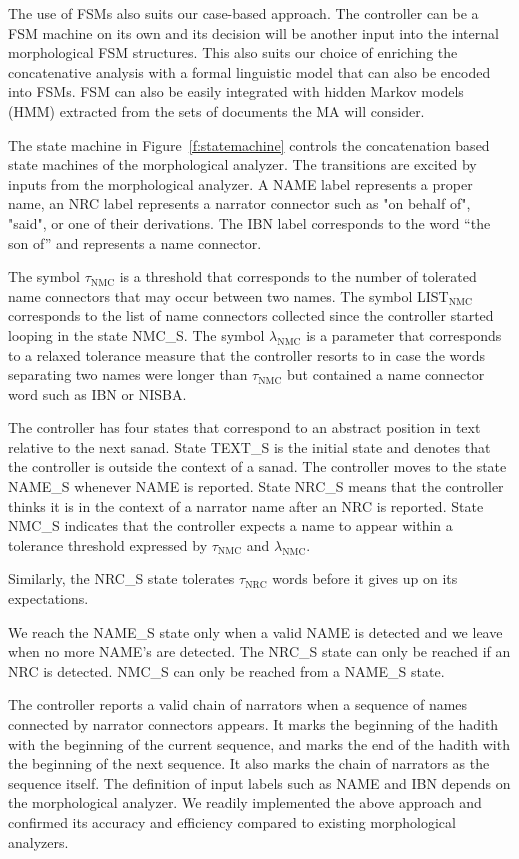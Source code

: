 \documentclass[12pt]{article}
\begin{document}
{The use of FSMs also suits our case-based approach. 
The controller can be a FSM machine on its own and its decision
will be another input into the internal morphological FSM structures. 
This also suits our choice of enriching the concatenative analysis
with a formal linguistic model that can also be encoded into FSMs. 
FSM can also be easily integrated with hidden Markov models (HMM)
extracted from the sets of documents the MA will consider. 

The state machine in Figure~\ref{f:statemachine} controls 
the concatenation based state machines of the morphological
analyzer.
The transitions are excited
by inputs from the morphological analyzer. 
A NAME label represents a proper name, 
an NRC label represents a narrator connector such as
 "on behalf of",  "said", 
or one of their derivations. 
The IBN label corresponds to the word  
``the son of'' and represents a name connector.

The symbol $\tau_{\mbox{NMC}}$ is a threshold
that corresponds to the number of tolerated name connectors 
that may occur between two names. 
The symbol LIST$_{\mbox{NMC}}$ corresponds to the list 
of name connectors collected since the controller
started looping in the state NMC\_S. 
The symbol $\lambda_{\mbox{NMC}}$ is a parameter 
that corresponds to a relaxed tolerance measure that
the controller resorts to in case the words separating
two names were longer than $\tau_{\mbox{NMC}}$ but 
contained a name connector word such as IBN or NISBA.

The controller has four states that correspond to 
an abstract position in text relative to the next sanad. 
State TEXT\_S is the initial state and denotes that
the controller is outside the context of a sanad.
The controller moves to the state NAME\_S whenever
NAME is reported.
State NRC\_S means that the controller thinks it is in the context
of a narrator name after an NRC is reported.
State NMC\_S
indicates that the controller expects a name to appear within 
a tolerance threshold expressed by 
$\tau_{\mbox{NMC}}$ and $\lambda_{\mbox{NMC}}$.

Similarly, the NRC\_S state tolerates $\tau_{\mbox{NRC}}$ words 
before it gives up on its expectations. 

We reach the NAME\_S state only when a
valid NAME is detected and we leave when no more NAME's 
are detected. 
The NRC\_S state can only be reached if an NRC is detected.
NMC\_S can only be reached from a NAME\_S state.

The controller reports a valid chain of narrators when a 
sequence of names
connected by narrator connectors appears. 
It marks the beginning of the hadith with the beginning of the 
current sequence,
and marks the end of the hadith with the beginning of the next 
sequence. 
It also marks the chain of narrators as the sequence itself. 
The definition of input labels such as NAME and IBN depends on 
the morphological analyzer. 
We readily implemented the above approach and confirmed its 
accuracy and efficiency compared to existing morphological
analyzers. 

}
\end{document}
